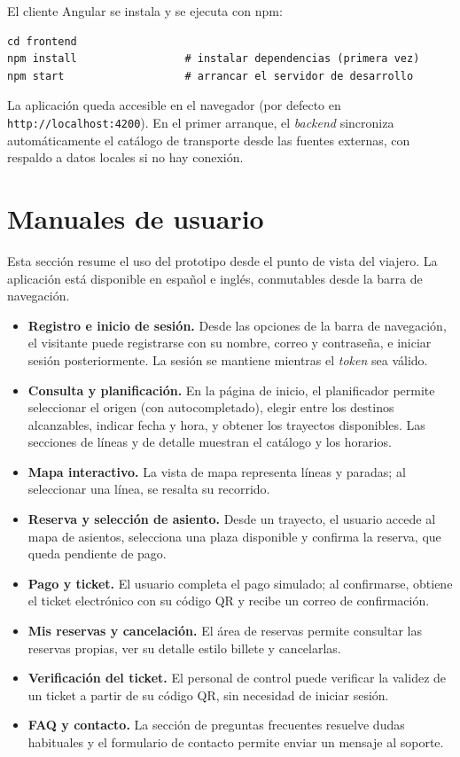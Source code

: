 El cliente Angular se instala y se ejecuta con npm:

\begin{verbatim}
cd frontend
npm install                 # instalar dependencias (primera vez)
npm start                   # arrancar el servidor de desarrollo
\end{verbatim}

La aplicación queda accesible en el navegador (por defecto en \texttt{http://localhost:4200}). En el primer arranque, el \textit{backend} sincroniza automáticamente el catálogo de transporte desde las fuentes externas, con respaldo a datos locales si no hay conexión.


\section{Manuales de usuario}
\label{sec:apendice-manuales}

Esta sección resume el uso del prototipo desde el punto de vista del viajero. La aplicación está disponible en español e inglés, conmutables desde la barra de navegación.

\begin{itemize}
  \item \textbf{Registro e inicio de sesión.} Desde las opciones de la barra de navegación, el visitante puede registrarse con su nombre, correo y contraseña, e iniciar sesión posteriormente. La sesión se mantiene mientras el \textit{token} sea válido.
  \item \textbf{Consulta y planificación.} En la página de inicio, el planificador permite seleccionar el origen (con autocompletado), elegir entre los destinos alcanzables, indicar fecha y hora, y obtener los trayectos disponibles. Las secciones de líneas y de detalle muestran el catálogo y los horarios.
  \item \textbf{Mapa interactivo.} La vista de mapa representa líneas y paradas; al seleccionar una línea, se resalta su recorrido.
  \item \textbf{Reserva y selección de asiento.} Desde un trayecto, el usuario accede al mapa de asientos, selecciona una plaza disponible y confirma la reserva, que queda pendiente de pago.
  \item \textbf{Pago y ticket.} El usuario completa el pago simulado; al confirmarse, obtiene el ticket electrónico con su código QR y recibe un correo de confirmación.
  \item \textbf{Mis reservas y cancelación.} El área de reservas permite consultar las reservas propias, ver su detalle estilo billete y cancelarlas.
  \item \textbf{Verificación del ticket.} El personal de control puede verificar la validez de un ticket a partir de su código QR, sin necesidad de iniciar sesión.
  \item \textbf{FAQ y contacto.} La sección de preguntas frecuentes resuelve dudas habituales y el formulario de contacto permite enviar un mensaje al soporte.
\end{itemize}


